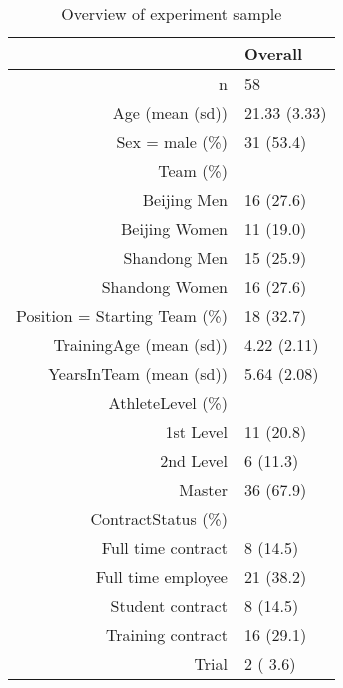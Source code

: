 \begin{table}[ht]
\centering
\begin{tabular}{rl}
  \hline
 & Overall \\ 
  \hline
n &    58 \\ 
  Age (mean (sd)) & 21.33 (3.33) \\ 
  Sex = male (\%) &    31 (53.4)  \\ 
  Team (\%) &     \\ 
     Beijing Men &    16 (27.6)  \\ 
     Beijing Women &    11 (19.0)  \\ 
     Shandong Men &    15 (25.9)  \\ 
     Shandong Women &    16 (27.6)  \\ 
  Position = Starting Team (\%) &    18 (32.7)  \\ 
  TrainingAge (mean (sd)) &  4.22 (2.11) \\ 
  YearsInTeam (mean (sd)) &  5.64 (2.08) \\ 
  AthleteLevel (\%) &     \\ 
     1st Level &    11 (20.8)  \\ 
     2nd Level &     6 (11.3)  \\ 
     Master &    36 (67.9)  \\ 
  ContractStatus (\%) &     \\ 
     Full time contract &     8 (14.5)  \\ 
     Full time employee &    21 (38.2)  \\ 
     Student contract &     8 (14.5)  \\ 
     Training contract &    16 (29.1)  \\ 
     Trial &     2 ( 3.6)  \\ 
   \hline
\end{tabular}
\caption{Overview of experiment sample} 
\label{tab:athleteDescriptivesTraining}
\end{table}

